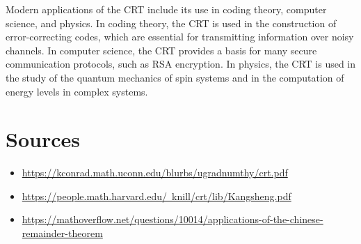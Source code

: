 \documentclass[12pt]{article}
\begin{document}
Modern applications of the CRT include its use in coding theory, computer 
science, and physics. In coding theory, the CRT is used in the construction 
of error-correcting codes, which are essential for transmitting information 
over noisy channels. In computer science, the CRT provides a basis for many 
secure communication protocols, such as RSA encryption. In physics, the CRT 
is used in the study of the quantum mechanics of spin systems and in the 
computation of energy levels in complex systems.


\pagebreak
\section*{Sources}
\begin{itemize}
    \item \href{https://kconrad.math.uconn.edu/blurbs/ugradnumthy/crt.pdf}{https://kconrad.math.uconn.edu/blurbs/ugradnumthy/crt.pdf}
    \item \href{https://people.math.harvard.edu/~knill/crt/lib/Kangsheng.pdf}{https://people.math.harvard.edu/~knill/crt/lib/Kangsheng.pdf}
    \item \href{https://mathoverflow.net/questions/10014/applications-of-the-chinese-remainder-theorem}{https://mathoverflow.net/questions/10014/applications-of-the-chinese-remainder-theorem}
\end{itemize}
\end{document}
